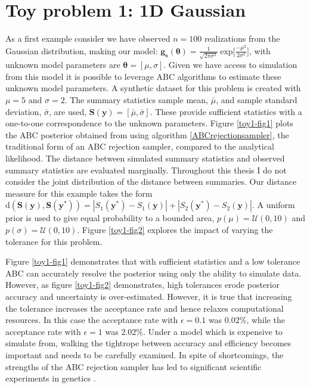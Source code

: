 \section{Toy problem 1: 1D Gaussian}
As a first example consider we have observed $n = 100$ realizations from the Gaussian distribution, making our model: $\bm{g_s}(\bm{\theta}) = \frac{1}{\sqrt{2\pi\sigma^2}}\ \text{exp}\Big[\frac{-\mu^2}{2\sigma^2}\Big]$, with unknown model parameters are $\bm{\theta} = [\mu,\sigma]$. Given we have access to simulation from this model it is possible to leverage ABC algorithms to estimate these unknown model parameters. A synthetic dataset for this problem is created with $\mu = 5$ and $\sigma = 2$. The summary statistics sample mean, $\bar{\mu}$, and sample standard deviation, $\bar{\sigma}$, are used, $\bm{S}(\bm{y}) = [\bar{\mu},\bar{\sigma}]$. These provide sufficient statistics with a one-to-one correspondence to the unknown parameters. Figure \ref{toy1-fig1} plots the ABC posterior obtained from using algorithm \ref{ABCrejectionsampler}, the traditional form of an ABC rejection sampler, compared to the analytical likelihood. The distance between simulated summary statistics and observed summary statistics are evaluated marginally. Throughout this thesis I do not consider the joint distribution of the distance between summaries. Our distance measure for this example takes the form $\text{d}(\bm{S}(\bm{y}),\bm{S}(\bm{y^*})) = |S_1(\bm{y^*}) - S_1(\bm{y})| +| S_2(\bm{y^*}) - S_2(\bm{y})|$. A uniform prior is used to give equal probability to a bounded area, $p(\mu) = \mathcal{U}(0,10)$ and $p(\sigma) = \mathcal{U}(0,10)$. Figure \ref{toy1-fig2} explores the impact of varying the tolerance for this problem.\par

Figure \ref{toy1-fig1} demonstrates that with sufficient statistics and a low tolerance ABC can accurately resolve the posterior using only the ability to simulate data. However, as figure \ref{toy1-fig2} demonstrates, high tolerances erode posterior accuracy and uncertainty is over-estimated. However, it is true that increasing the tolerance increases the acceptance rate and hence relaxes computational resources. In this case the acceptance rate with $\epsilon = 0.1$ was $0.02\%$, while the acceptance rate with $\epsilon = 1$ was $2.02\%$. Under a model which is expensive to simulate from, walking the tightrope between accuracy and efficiency becomes important and needs to be carefully examined. In spite of shortcomings, the strengths of the ABC rejection sampler has led to significant scientific experiments in genetics \citep{Fu1997,Weiss1998a,Pritchard1999a}.

